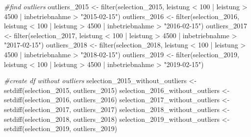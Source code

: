 \documentclass[a4paper,11pt]{article}
\newenvironment{Shaded}{\begin{snugshade}}{\end{snugshade}}
\newcommand{\CommentTok}[1]{\textcolor[rgb]{0.56,0.35,0.01}{\textit{#1}}}
\newcommand{\DecValTok}[1]{\textcolor[rgb]{0.00,0.00,0.81}{#1}}
\newcommand{\FunctionTok}[1]{\textcolor[rgb]{0.00,0.00,0.00}{#1}}
\newcommand{\NormalTok}[1]{#1}
\newcommand{\OtherTok}[1]{\textcolor[rgb]{0.56,0.35,0.01}{#1}}
\newcommand{\SpecialCharTok}[1]{\textcolor[rgb]{0.00,0.00,0.00}{#1}}
\newcommand{\StringTok}[1]{\textcolor[rgb]{0.31,0.60,0.02}{#1}}
\begin{document}
\begin{Shaded}
\begin{Highlighting}[]
\CommentTok{\#find outliers}
\NormalTok{outliers\_2015 }\OtherTok{\textless{}{-}} \FunctionTok{filter}\NormalTok{(selection\_2015, leistung }\SpecialCharTok{\textless{}} \DecValTok{100} \SpecialCharTok{|}\NormalTok{ leistung }\SpecialCharTok{\textgreater{}} \DecValTok{4500} \SpecialCharTok{|} 
\NormalTok{                          inbetriebnahme }\SpecialCharTok{\textgreater{}} \StringTok{"2015{-}02{-}15"}\NormalTok{)}
\NormalTok{outliers\_2016 }\OtherTok{\textless{}{-}} \FunctionTok{filter}\NormalTok{(selection\_2016, leistung }\SpecialCharTok{\textless{}} \DecValTok{100} \SpecialCharTok{|}\NormalTok{ leistung }\SpecialCharTok{\textgreater{}} \DecValTok{4500} \SpecialCharTok{|} 
\NormalTok{                          inbetriebnahme }\SpecialCharTok{\textgreater{}} \StringTok{"2016{-}02{-}15"}\NormalTok{)}
\NormalTok{outliers\_2017 }\OtherTok{\textless{}{-}} \FunctionTok{filter}\NormalTok{(selection\_2017, leistung }\SpecialCharTok{\textless{}} \DecValTok{100} \SpecialCharTok{|}\NormalTok{ leistung }\SpecialCharTok{\textgreater{}} \DecValTok{4500} \SpecialCharTok{|} 
\NormalTok{                          inbetriebnahme }\SpecialCharTok{\textgreater{}} \StringTok{"2017{-}02{-}15"}\NormalTok{)}
\NormalTok{outliers\_2018 }\OtherTok{\textless{}{-}} \FunctionTok{filter}\NormalTok{(selection\_2018, leistung }\SpecialCharTok{\textless{}} \DecValTok{100} \SpecialCharTok{|}\NormalTok{ leistung }\SpecialCharTok{\textgreater{}} \DecValTok{4500} \SpecialCharTok{|} 
\NormalTok{                          inbetriebnahme }\SpecialCharTok{\textgreater{}} \StringTok{"2018{-}02{-}15"}\NormalTok{)}
\NormalTok{outliers\_2019 }\OtherTok{\textless{}{-}} \FunctionTok{filter}\NormalTok{(selection\_2019, leistung }\SpecialCharTok{\textless{}} \DecValTok{100} \SpecialCharTok{|}\NormalTok{ leistung }\SpecialCharTok{\textgreater{}} \DecValTok{4500} \SpecialCharTok{|} 
\NormalTok{                          inbetriebnahme }\SpecialCharTok{\textgreater{}} \StringTok{"2019{-}02{-}15"}\NormalTok{)}

\CommentTok{\#create df without outliers}
\NormalTok{selection\_2015\_without\_outliers }\OtherTok{\textless{}{-}} \FunctionTok{setdiff}\NormalTok{(selection\_2015, outliers\_2015)}
\NormalTok{selection\_2016\_without\_outliers }\OtherTok{\textless{}{-}} \FunctionTok{setdiff}\NormalTok{(selection\_2016, outliers\_2016)}
\NormalTok{selection\_2017\_without\_outliers }\OtherTok{\textless{}{-}} \FunctionTok{setdiff}\NormalTok{(selection\_2017, outliers\_2017)}
\NormalTok{selection\_2018\_without\_outliers }\OtherTok{\textless{}{-}} \FunctionTok{setdiff}\NormalTok{(selection\_2018, outliers\_2018)}
\NormalTok{selection\_2019\_without\_outliers }\OtherTok{\textless{}{-}} \FunctionTok{setdiff}\NormalTok{(selection\_2019, outliers\_2019)}


\end{Highlighting}
\end{Shaded}
\end{document}
